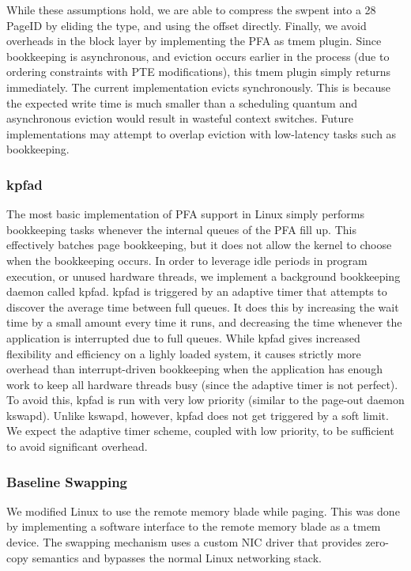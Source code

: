 While these assumptions hold, we are able to compress the \gls{swpent} into a
\SI{28}{\bit} PageID by eliding the type, and using the offset directly.
Finally, we avoid overheads in the block layer by implementing the PFA as
\gls{tmem} plugin. Since bookkeeping is asynchronous, and eviction occurs
earlier in the process (due to ordering constraints with PTE modifications),
this \gls{tmem} plugin simply returns immediately. The current implementation
evicts synchronously. This is because the expected write time is much smaller
than a scheduling quantum and asynchronous eviction would result in wasteful
context switches. Future implementations may attempt to overlap eviction with
low-latency tasks such as bookkeeping.

\subsubsection{kpfad} \label{sec:kpfad}
The most basic implementation of PFA support in Linux simply performs
bookkeeping tasks whenever the internal queues of the PFA fill up. This
effectively batches page bookkeeping, but it does not allow the kernel to
choose when the bookkeeping occurs. In order to leverage idle periods in
program execution, or unused hardware threads, we implement a background
bookkeeping daemon called \gls{kpfad}. \Gls{kpfad} is triggered by an adaptive
timer that attempts to discover the average time between full queues. It does
this by increasing the wait time by a small amount every time it runs, and
decreasing the time whenever the application is interrupted due to full queues. 
While \gls{kpfad} gives increased flexibility and efficiency on a lighly
loaded system, it causes strictly more overhead than interrupt-driven
bookkeeping when the application has enough work to keep all hardware threads
busy (since the adaptive timer is not perfect). To avoid this, \gls{kpfad} is run
with very low priority (similar to the page-out daemon \gls{kswapd}). Unlike
\gls{kswapd}, however, \gls{kpfad} does not get triggered by a soft limit. We expect
the adaptive timer scheme, coupled with low priority, to be sufficient to avoid
significant overhead.

\subsubsection{Baseline Swapping}
We modified Linux to use the remote memory blade while paging. This was done by
implementing a software interface to the remote memory blade as a \gls{tmem}
device. The swapping mechanism uses a custom NIC driver that provides zero-copy
semantics and bypasses the normal Linux networking stack. 

